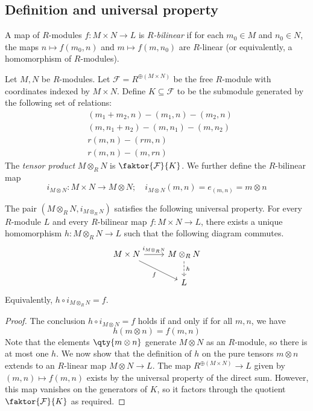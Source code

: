 \subsection{Definition and universal property}
\begin{definition}
    A map of \( R \)-modules \( f : M \times N \to L \) is \emph{\( R \)-bilinear} if for each \( m_0 \in M \) and \( n_0 \in N \), the maps \( n \mapsto f(m_0, n) \) and \( m \mapsto f(m, n_0) \) are \( R \)-linear (or equivalently, a homomorphism of \( R \)-modules).
\end{definition}
\begin{definition}
    Let \( M, N \) be \( R \)-modules.
    Let \( \mathcal F = R^{\oplus(M \times N)} \) be the free \( R \)-module with coordinates indexed by \( M \times N \).
    Define \( K \subseteq \mathcal F \) to be the submodule generated by the following set of relations:
    \begin{align*}
        &(m_1 + m_2, n) - (m_1, n) - (m_2, n) \\
        &(m, n_1 + n_2) - (m, n_1) - (m, n_2) \\
        &r (m, n) - (rm, n) \\
        &r (m, n) - (m, rn)
    \end{align*}
    The \emph{tensor product} \( M \otimes_R N \) is \( \faktor{\mathcal F}{K} \).
    We further define the \( R \)-bilinear map
    \[ i_{M \otimes N} : M \times N \to M \otimes N;\quad i_{M \otimes N}(m, n) = e_{(m, n)} = m \otimes n \]
\end{definition}
\begin{proposition}
    The pair \( (M \otimes_R N, i_{M \otimes_R N}) \) satisfies the following universal property.
    For every \( R \)-module \( L \) and every \( R \)-bilinear map \( f : M \times N \to L \), there exists a unique homomorphism \( h : M \otimes_R N \to L \) such that the following diagram commutes.
    \[\begin{tikzcd}
        {M \times N} & {M \otimes_R N} \\
        & L
        \arrow["{i_{M \otimes_R N}}", from=1-1, to=1-2]
        \arrow["h", dashed, from=1-2, to=2-2]
        \arrow["f"', from=1-1, to=2-2]
    \end{tikzcd}\]
    Equivalently, \( h \circ i_{M \otimes_R N} = f \).
\end{proposition}
\begin{proof}
    The conclusion \( h \circ i_{M \otimes N} = f \) holds if and only if for all \( m, n \), we have
    \[ h(m \otimes n) = f(m, n) \]
    Note that the elements \( \qty{m \otimes n} \) generate \( M \otimes N \) as an \( R \)-module, so there is at most one \( h \).
    We now show that the definition of \( h \) on the pure tensors \( m \otimes n \) extends to an \( R \)-linear map \( M \otimes N \to L \).
    The map \( R^{\oplus(M \times N)} \to L \) given by \( (m, n) \mapsto f(m, n) \) exists by the universal property of the direct sum.
    However, this map vanishes on the generators of \( K \), so it factors through the quotient \( \faktor{\mathcal F}{K} \) as required.
\end{proof}
